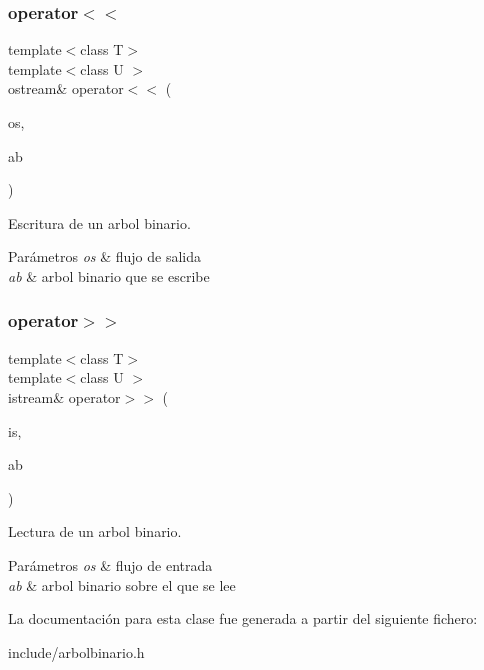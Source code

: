 \subsubsection{\texorpdfstring{operator$<$$<$}{operator<<}}
{\footnotesize\ttfamily template$<$class T$>$ \\
template$<$class U $>$ \\
ostream\& operator$<$$<$ (\begin{DoxyParamCaption}\item[{ostream \&}]{os,  }\item[{const \hyperlink{classArbolBinario}{Arbol\+Binario}$<$ U $>$ \&}]{ab }\end{DoxyParamCaption})\hspace{0.3cm}{\ttfamily [friend]}}



Escritura de un arbol binario. 


\begin{DoxyParams}{Parámetros}
{\em os} & flujo de salida \\
\hline
{\em ab} & arbol binario que se escribe \\
\hline
\end{DoxyParams}
\mbox{\label{classArbolBinario_a917493bedd4f7e4430d3283f367ce599}} 
\subsubsection{\texorpdfstring{operator$>$$>$}{operator>>}}
{\footnotesize\ttfamily template$<$class T$>$ \\
template$<$class U $>$ \\
istream\& operator$>$$>$ (\begin{DoxyParamCaption}\item[{istream \&}]{is,  }\item[{\hyperlink{classArbolBinario}{Arbol\+Binario}$<$ U $>$ \&}]{ab }\end{DoxyParamCaption})\hspace{0.3cm}{\ttfamily [friend]}}



Lectura de un arbol binario. 


\begin{DoxyParams}{Parámetros}
{\em os} & flujo de entrada \\
\hline
{\em ab} & arbol binario sobre el que se lee \\
\hline
\end{DoxyParams}


La documentación para esta clase fue generada a partir del siguiente fichero\+:\begin{DoxyCompactItemize}
\item 
include/arbolbinario.\+h\end{DoxyCompactItemize}
